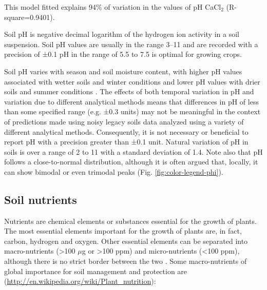 \documentclass[graybox,natbib,nospthms,UStrade]{svmono}
\let\BeginKnitrBlock\begin \let\EndKnitrBlock\end
\let\BeginKnitrBlock\begin \let\EndKnitrBlock\end
\begin{document}
This model fitted explains 94\% of variation in the values of pH CaCl\(_2\) (R-square=0.9401).

\BeginKnitrBlock{rmdnote}
Soil pH is negative decimal logarithm of the hydrogen ion activity in a
soil suspension. Soil pH values are usually in the range 3--11 and are
recorded with a precision of ±0.1 pH in the range of 5.5 to 7.5 is
optimal for growing crops.
\EndKnitrBlock{rmdnote}

Soil pH varies with season and soil moisture content, with higher pH
values associated with wetter soils and winter conditions and lower pH
values with drier soils and summer conditions \citep{Miller2010SSSAJ}. The
effects of both temporal variation in pH and variation due to different
analytical methods means that differences in pH of less than some
specified range (e.g. ±0.3 units) may not be meaningful in the
context of predictions made using noisy legacy soils data analyzed using
a variety of different analytical methods. Consequently, it is not
necessary or beneficial to report pH with a precision greater than
±0.1 unit. Natural variation of pH in soils is over a range of 2 to
11 with a standard deviation of 1.4. Note also that pH follows
a close-to-normal distribution, although it is often argued that, locally,
it can show bimodal or even trimodal peaks
(Fig. \ref{fig:color-legend-phi}).

\hypertarget{soil-nutrients}{%
\subsection{Soil nutrients}\label{soil-nutrients}}

Nutrients are chemical elements or substances essential for the growth
of plants. The most essential elements important for the growth of
plants are, in fact, carbon, hydrogen and oxygen. Other essential elements
can be separated into macro-nutrients (\textgreater{}100 \(\mu\)g or \textgreater{}100 ppm) and micro-nutrients
(\textless{}100 ppm), although there is no strict border between the two
\citep{harpstead2001soil, hengl2017soil}. Some macro-nutrients of global importance for soil
management and protection are (\url{http://en.wikipedia.org/wiki/Plant_nutrition}):
\end{document}
